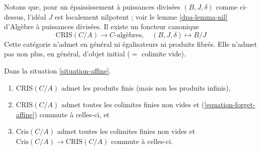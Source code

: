 \noindent
Notons que, pour un épaississement à puissances divisées $(B, J, \delta)$ comme ci-dessus,
l'idéal $J$ est localement nilpotent ; voir le
lemme \ref{dpa-lemma-nil} d'Algèbre à puissances divisées.
Il existe un foncteur canonique
\begin{equation}
\label{equation-forget-affine}
\text{CRIS}(C/A) \longrightarrow C\text{-algèbres},\quad
(B, J, \delta) \longmapsto B/J
\end{equation}
Cette catégorie n'admet en général ni égalisateurs ni produits fibrés.
Elle n'admet pas non plus, en général, d'objet initial ($=$ colimite vide).

\begin{lemma}
\label{lemma-affine-thickenings-colimits}
Dans la situation \ref{situation-affine}.
\begin{enumerate}
\item $\text{CRIS}(C/A)$ admet les produits finis (mais non les produits infinis),
\item $\text{CRIS}(C/A)$ admet toutes les colimites finies non vides et
(\ref{equation-forget-affine}) commute à celles-ci, et
\item $\text{Cris}(C/A)$ admet toutes les colimites finies non vides et
$\text{Cris}(C/A) \to \text{CRIS}(C/A)$ commute à celles-ci.
\end{enumerate}
\end{lemma}

